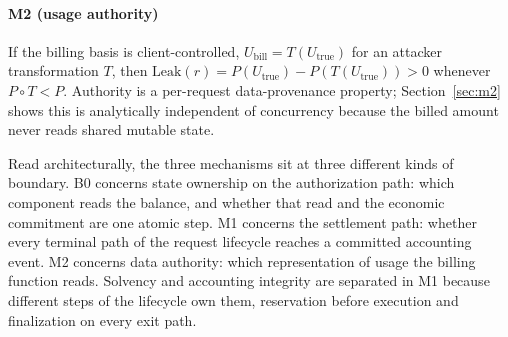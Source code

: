 \documentclass[manuscript,review]{acmart}
\begin{document}
\paragraph{M2 (usage authority)}
If the billing basis is client-controlled, $U_{\text{bill}} = T(U_{\text{true}})$ for an
attacker transformation $T$, then $\mathrm{Leak}(r) = P(U_{\text{true}}) -
P(T(U_{\text{true}})) > 0$ whenever $P \circ T < P$. Authority is a per-request
data-provenance property; Section~\ref{sec:m2} shows this is analytically independent of
concurrency because the billed amount never reads shared mutable state.

\begin{table}[t]
\centering
\caption{Structural distinction between the three mechanisms: what is defective, what
triggers the baseline manifestation we implemented, and what closes it. ``Trigger'' is
implementation-specific; the general condition (final column of Table~\ref{tab:practical})
is what actually matters and is not concurrency-specific for any of the three.}
\label{tab:structural}
\end{table}

Read architecturally, the three mechanisms sit at three different kinds of boundary. B0
concerns state ownership on the authorization path: which component reads the balance,
and whether that read and the economic commitment are one atomic step. M1 concerns the
settlement path: whether every terminal path of the request lifecycle reaches a committed
accounting event. M2 concerns data authority: which representation of usage the billing
function reads. Solvency and accounting integrity are separated in M1 because different
steps of the lifecycle own them, reservation before execution and finalization on every
exit path.
\end{document}
